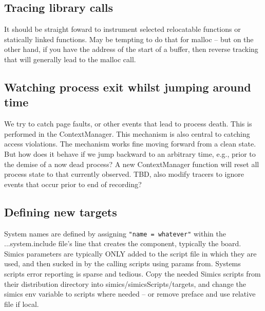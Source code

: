 \documentclass[titlepage]{article}
\begin{document}
\begin{appendices}
\subsection{Tracing library calls}
It should be straight foward to instrument selected relocatable functions or statically linked functions.
May be tempting to do that for malloc -- but on the other hand, if you have the address of the start of a buffer, then reverse tracking that
will generally lead to the malloc call.



\subsection{Watching process exit whilst jumping around time}
We try to catch page faults, or other events that lead to process death.  This is performed in the ContextManager.  
This mechanism is also central to catching access violations.  The mechanism works fine moving forward from a clean state.  But
how does it behave if we jump backward to an arbitrary time, e.g., prior to the demise of a now dead process?  A new ContextManager function
will reset all process state to that currently observed.  TBD, also modify tracers to ignore events that occur prior to end of recording?

\subsection{Defining new targets}
System names are defined by assigning {\tt "name = whatever"} within the ...system.include file's line that creates the component, typically the board.
Simics parameters are typically ONLY added to the script file in which they are used, and then sucked in by the calling scripts using params from.
Systems scripts error reporting is sparse and tedious.   Copy the needed Simics scripts from their distribution directory into simics/simicsScripts/targets,
and change the simics env variable to scripts where needed -- or remove preface and use relative file if local. 


\end{appendices}
\end{document}
